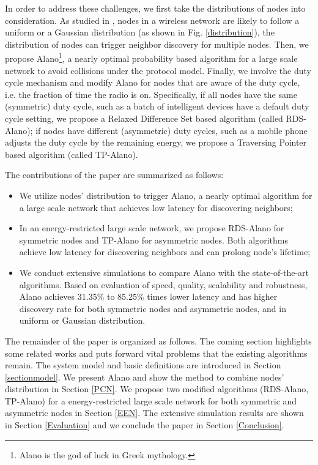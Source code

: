In order to address these challenges, we first take the distributions of nodes into consideration. As studied in \cite{wang2013gaussian}, nodes in a wireless network are likely to follow a uniform or a Gaussian distribution (as shown in Fig. \ref{distribution}), the distribution of nodes can trigger neighbor discovery for multiple nodes. Then, we propose Alano\footnote{Alano is the god of luck in Greek mythology.}, a nearly optimal probability based algorithm for a large scale network to avoid collisions under the protocol model. Finally, we involve the duty cycle mechanism and modify Alano for nodes that are aware of the duty cycle, i.e. the fraction of time the radio is on. Specifically, if all nodes have the same (symmetric) duty cycle, such as a batch of intelligent devices have a default duty cycle setting, we propose a Relaxed Difference Set based algorithm (called RDS-Alano); if nodes have different (asymmetric) duty cycles, such as a mobile phone adjusts the duty cycle by the remaining energy, we propose a Traversing Pointer based algorithm (called TP-Alano).

The contributions of the paper are summarized as follows:
\begin{itemize}
\item[1)] We utilize nodes' distribution to trigger Alano, a nearly optimal algorithm for a large scale network that achieves low latency for discovering neighbors;
\item[2)] In an energy-restricted large scale network, we propose RDS-Alano for symmetric nodes and TP-Alano for asymmetric nodes. Both algorithms achieve low latency for discovering neighbors and can prolong node's lifetime;
\item[3)] We conduct extensive simulations to compare Alano with the state-of-the-art algorithms. Based on evaluation of speed, quality, scalability and robustness, Alano achieves $31.35\%$ to $ 85.25\%$ times lower latency and has higher discovery rate for both symmetric nodes and asymmetric nodes, and in uniform or Gaussian distribution.
\end{itemize}

The remainder of the paper is organized as follows. The coming section highlights some related works and puts forward vital problems that the existing algorithms remain. The system model and basic definitions are introduced in Section \ref{sectionmodel}. We present Alano and show the method to combine nodes' distribution in Section \ref{PCN}. We propose two modified algorithms (RDS-Alano, TP-Alano) for a energy-restricted large scale network for both symmetric and asymmetric nodes in Section \ref{EEN}. The extensive simulation results are shown in Section \ref{Evaluation} and we conclude the paper in Section \ref{Conclusion}.




